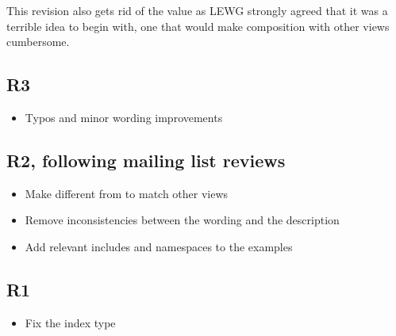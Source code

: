 \documentclass{wg21}
\begin{document}
This revision also gets rid of the   value as LEWG strongly agreed that it was a terrible idea to begin with, one that would make composition with other views cumbersome.

\subsection{R3}

\begin{itemize}
    \item Typos and minor wording improvements
\end{itemize}

\subsection{R2, following mailing list reviews}
\begin{itemize}
    \item Make  different from   to match other views
    \item Remove inconsistencies between the wording and the description
    \item Add relevant includes and namespaces to the examples
\end{itemize}


\subsection{R1}
\begin{itemize}
\item Fix the index type
\end{itemize}
\end{document}
